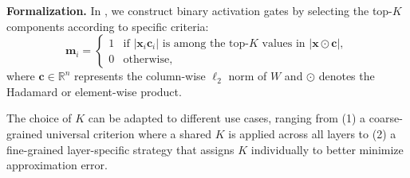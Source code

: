\textbf{Formalization.}
In \algacro{}, we construct binary activation gates by selecting the top-$K$ components according to specific criteria:
\begin{equation}
	\bm{m}_i = \begin{cases}
		1 & \text{if } |\bm{x}_i \bm{c}_i| \text{ is among the top-$K$ values in } |\bm{x} \odot \bm{c}|, \\
		0 & \text{otherwise},
	\end{cases}
\end{equation}
where $\bm{c} \in \mathbb{R}^n$ represents the column-wise $\ell_2$ norm of $W$ and $\odot$ denotes the Hadamard or element-wise product.

The choice of $K$ can be adapted to different use cases, ranging from
(1) a coarse-grained universal criterion where a shared $K$ is applied across all layers to (2) a fine-grained layer-specific strategy that assigns $K$ individually to better minimize approximation error. 



